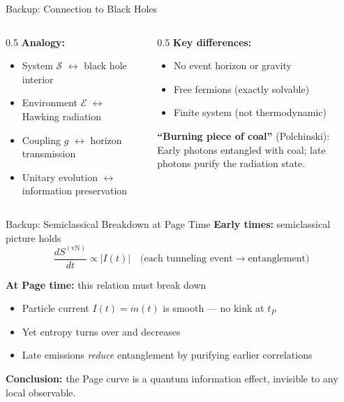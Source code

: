 \documentclass[aspectratio=169,11pt]{beamer}
\begin{document}
\begin{frame}{Backup: Connection to Black Holes}
    \begin{columns}
        \begin{column}{0.5\textwidth}
            \textbf{Analogy:}
            \begin{itemize}
                \item System $\mathcal{S}$ $\longleftrightarrow$ black hole interior
                \item Environment $\mathcal{E}$ $\longleftrightarrow$ Hawking radiation
                \item Coupling $g$ $\longleftrightarrow$ horizon transmission
                \item Unitary evolution $\longleftrightarrow$ information preservation
            \end{itemize}
        \end{column}
        \begin{column}{0.5\textwidth}
            \textbf{Key differences:}
            \begin{itemize}
                \item No event horizon or gravity
                \item Free fermions (exactly solvable)
                \item Finite system (not thermodynamic)
            \end{itemize}
            
            \vspace{0.3cm}
            \textbf{``Burning piece of coal''} (Polchinski):\\
            {\footnotesize Early photons entangled with coal; late photons purify the radiation state.}
        \end{column}
    \end{columns}
\end{frame}

\begin{frame}{Backup: Semiclassical Breakdown at Page Time}
    \textbf{Early times:} semiclassical picture holds
    \[
    \frac{dS^{(\mathrm{vN})}}{dt} \propto |I(t)| \quad \text{(each tunneling event} \to \text{entanglement)}
    \]
    
    \vspace{0.3cm}
    
    \textbf{At Page time:} this relation \alert{must break down}
    \begin{itemize}
        \item Particle current $I(t) = \dot{m}(t)$ is smooth --- no kink at $t_P$
        \item Yet entropy turns over and decreases
        \item Late emissions \textit{reduce} entanglement by purifying earlier correlations
    \end{itemize}
    
    \vspace{0.3cm}
    
    \textbf{Conclusion:} the Page curve is a \alert{quantum information} effect, invisible to any local observable.
\end{frame}
\end{document}
